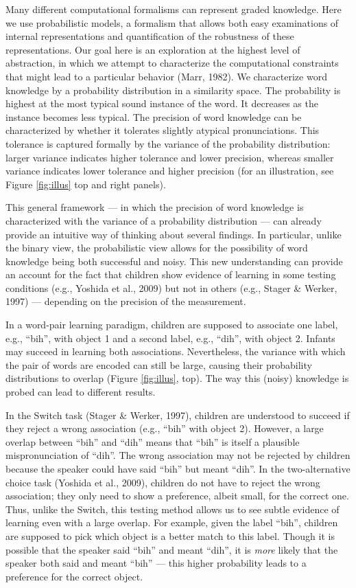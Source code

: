 \documentclass[english,,man]{apa6}
\begin{document}
Many different computational formalisms can represent graded knowledge. Here we use probabilistic models, a formalism that allows both easy examinations of internal representations and quantification of the robustness of these representations. Our goal here is an exploration at the highest level of abstraction, in which we attempt to characterize the computational constraints that might lead to a particular behavior (Marr, 1982). We characterize word knowledge by a probability distribution in a similarity space. The probability is highest at the most typical sound instance of the word. It decreases as the instance becomes less typical. The precision of word knowledge can be characterized by whether it tolerates slightly atypical pronunciations. This tolerance is captured formally by the variance of the probability distribution: larger variance indicates higher tolerance and lower precision, whereas smaller variance indicates lower tolerance and higher precision (for an illustration, see Figure \ref{fig:illus} top and right panels).

This general framework --- in which the precision of word knowledge is characterized with the variance of a probability distribution --- can already provide an intuitive way of thinking about several findings. In particular, unlike the binary view, the probabilistic view allows for the possibility of word knowledge being both successful and noisy. This new understanding can provide an account for the fact that children show evidence of learning in some testing conditions (e.g., Yoshida et al., 2009) but not in others (e.g., Stager \& Werker, 1997) --- depending on the precision of the measurement.

In a word-pair learning paradigm, children are supposed to associate one label, e.g., \enquote{bih}, with object 1 and a second label, e.g., \enquote{dih}, with object 2. Infants may succeed in learning both associations. Nevertheless, the variance with which the pair of words are encoded can still be large, causing their probability distributions to overlap (Figure \ref{fig:illus}, top). The way this (noisy) knowledge is probed can lead to different results.

In the Switch task (Stager \& Werker, 1997), children are understood to succeed if they reject a wrong association (e.g., \enquote{bih} with object 2). However, a large overlap between \enquote{bih} and \enquote{dih} means that \enquote{bih} is itself a plausible mispronunciation of \enquote{dih}. The wrong association may not be rejected by children because the speaker could have said \enquote{bih} but meant \enquote{dih}. In the two-alternative choice task (Yoshida et al., 2009), children do not have to reject the wrong association; they only need to show a preference, albeit small, for the correct one. Thus, unlike the Switch, this testing method allows us to see subtle evidence of learning even with a large overlap. For example, given the label \enquote{bih}, children are supposed to pick which object is a better match to this label. Though it is possible that the speaker said \enquote{bih} and meant \enquote{dih}, it is \emph{more} likely that the speaker both said and meant \enquote{bih} --- this higher probability leads to a preference for the correct object.
\end{document}
